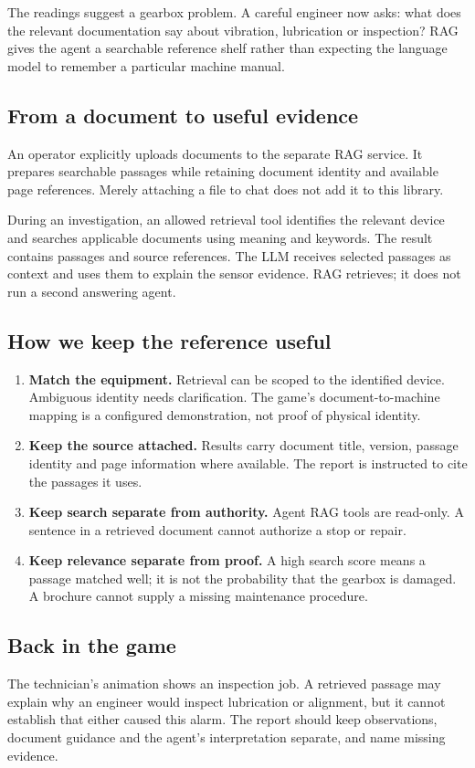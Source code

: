 The readings suggest a gearbox problem. A careful engineer now asks: what does the relevant documentation say about vibration, lubrication or inspection? RAG gives the agent a searchable reference shelf rather than expecting the language model to remember a particular machine manual.

\subsection*{From a document to useful evidence}
An operator explicitly uploads documents to the separate RAG service. It prepares searchable passages while retaining document identity and available page references. Merely attaching a file to chat does not add it to this library.

During an investigation, an allowed retrieval tool identifies the relevant device and searches applicable documents using meaning and keywords. The result contains passages and source references. The LLM receives selected passages as context and uses them to explain the sensor evidence. RAG retrieves; it does not run a second answering agent.

\subsection*{How we keep the reference useful}
\begin{enumerate}
\item \textbf{Match the equipment.} Retrieval can be scoped to the identified device. Ambiguous identity needs clarification. The game's document-to-machine mapping is a configured demonstration, not proof of physical identity.
\item \textbf{Keep the source attached.} Results carry document title, version, passage identity and page information where available. The report is instructed to cite the passages it uses.
\item \textbf{Keep search separate from authority.} Agent RAG tools are read-only. A sentence in a retrieved document cannot authorize a stop or repair.
\item \textbf{Keep relevance separate from proof.} A high search score means a passage matched well; it is not the probability that the gearbox is damaged. A brochure cannot supply a missing maintenance procedure.
\end{enumerate}

\subsection*{Back in the game}
The technician's animation shows an inspection job. A retrieved passage may explain why an engineer would inspect lubrication or alignment, but it cannot establish that either caused this alarm. The report should keep observations, document guidance and the agent's interpretation separate, and name missing evidence.

